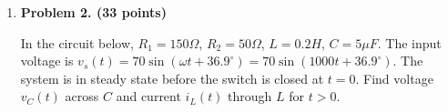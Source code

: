 \begin{enumerate}
\item {\bf Problem 2. (33 points)} 

  In the circuit below, $R_1=150\Omega$, $R_2=50\Omega$, $L=0.2H$, $C=5\mu F$.
  The input voltage is $v_s(t)=70\sin(\omega t+36.9^\circ)=70\sin(1000 t+36.9^\circ)$.
  The system is in steady state before the switch is closed at $t=0$. Find voltage 
  $v_C(t)$ across $C$ and current $i_L(t)$ through $L$ for $t>0$.


  \begin{comment}

  {\bf Solution:} 
  The phasor form of the input voltage is:
  \[
  \dot{V}_s=70/\sqrt{2}\angle 36.9^\circ =49.49\angle 36.9^\circ 
  \]
  Find $i_L(t)$:
  \[
  \dot{I}_L=\frac{\dot{V_s}}{R_1+R_2+j(\omega L-1/\omega C)}
  =\frac{49.49\angle 36.9^\circ}{150+50+j(200-200)}=0.247\angle 36.9^\circ 
  \]
  \[
  i_L(t)=0.35\;\sin(\omega t+36.9^\circ)\;\;\;\;\;(t<0) 
  \]
  \[
  i_L(0)=0.35\;\sin(36.9^\circ)=0.21\;A 
  \]
  \[
  \dot{V}_C=Z_C \dot{I}=\dot{I}/j\omega C =49.49\angle -53.1^\circ 
  \]
  \[
  v_C(0)=70\;sin(-53.1^\circ)=-55.98\;V 
  \]

  For $t>0$, the switch is closed, $\tau_C=R_2C=2.5\times 10^{-4}$, 
  $1/\tau_1=4000$, $\tau_L=L/R_1=1.33\times 10^{-3}$, $1/\tau_L=750$.
  As the steady state of $v_C(t)$ is zero, we can find $v_C(t)$ to be
  \[
  v_C(t)=-55.98\;e^{-4000  t} 
  \]
  Find steady state of $i_L(t)$:
  \[
  \dot{I}_L=\frac{\dot{V}_s}{R_1+j\omega L}=\frac{49.49\angle 36.9}{150+j200}
  =0.2\angle -16.23 
  \]
  the steady state of $i_L(t)$ is
  \[ 
  i_L(t)=0.2\sqrt{2}\sin(\omega t-16.23^\circ)=0.283\sin(\omega t-16.23^\circ) 
  \]
  Evaluating $i_L(t)$ at $t=0$ we get:
  \[ 
  i_L(0)=0.283\sin(-16.23^\circ)=-0.08 
  \]
  The complete $i_L(t)$ is
  \[
  i_L(t)=0.283\sin(\omega t-16.23^\circ)+[0.21-(-0.08)]e^{-t/\tau_L}
  =0.283\sin(\omega t-16.23^\circ)+0.29\;e^{-750\;t} 
  \]

  \end{comment}


%



\end{enumerate}

